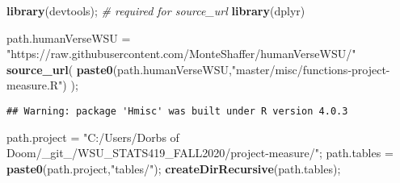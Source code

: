 \documentclass[]{article}
\newenvironment{Shaded}{\begin{snugshade}}{\end{snugshade}}
\newcommand{\CommentTok}[1]{\textcolor[rgb]{0.56,0.35,0.01}{\textit{#1}}}
\newcommand{\KeywordTok}[1]{\textcolor[rgb]{0.13,0.29,0.53}{\textbf{#1}}}
\newcommand{\NormalTok}[1]{#1}
\newcommand{\StringTok}[1]{\textcolor[rgb]{0.31,0.60,0.02}{#1}}
\begin{document}
\vskip -8.5pt




\noindent  

\begin{Shaded}
\begin{Highlighting}[]
\KeywordTok{library}\NormalTok{(devtools);       }\CommentTok{# required for source_url}
\KeywordTok{library}\NormalTok{(dplyr)}

\NormalTok{path.humanVerseWSU =}\StringTok{ "https://raw.githubusercontent.com/MonteShaffer/humanVerseWSU/"}
\KeywordTok{source_url}\NormalTok{( }\KeywordTok{paste0}\NormalTok{(path.humanVerseWSU,}\StringTok{"master/misc/functions-project-measure.R"}\NormalTok{) );}
\end{Highlighting}
\end{Shaded}

\begin{verbatim}
## Warning: package 'Hmisc' was built under R version 4.0.3
\end{verbatim}

\begin{Shaded}
\begin{Highlighting}[]
\NormalTok{path.project =}\StringTok{ "C:/Users/Dorbs of Doom/_git_/WSU_STATS419_FALL2020/project-measure/"}\NormalTok{;}
\NormalTok{path.tables =}\StringTok{ }\KeywordTok{paste0}\NormalTok{(path.project,}\StringTok{"tables/"}\NormalTok{);}
  \KeywordTok{createDirRecursive}\NormalTok{(path.tables);}
\end{Highlighting}
\end{Shaded}
\end{document}
